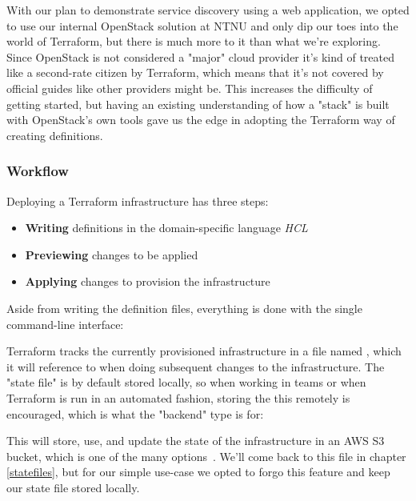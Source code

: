             With our plan to demonstrate service discovery using a web application, we opted to use our internal OpenStack solution at NTNU and only dip our toes into the world of Terraform, but there is much more to it than what we're exploring. Since OpenStack is not considered a "major" cloud provider it's kind of treated like a second-rate citizen by Terraform, which means that it's not covered by official guides like other providers might be. This increases the difficulty of getting started, but having an existing understanding of how a "stack" is built with OpenStack's own tools gave us the edge in adopting the Terraform way of creating definitions.
            
            \subsubsection{Workflow} \label{terraform_workflow}
                Deploying a Terraform infrastructure has three steps:
                \begin{itemize}
                    \item \textbf{Writing} definitions in the domain-specific language \textit{HCL}
                    \item \textbf{Previewing} changes to be applied
                    \item \textbf{Applying} changes to provision the infrastructure
                \end{itemize}
                
                Aside from writing the definition files, everything is done with the single  command-line interface:
                
                
                Terraform tracks the currently provisioned infrastructure in a file named , which it will reference to when doing subsequent changes to the infrastructure. The "state file" is by default stored locally, so when working in teams or when Terraform is run in an automated fashion, storing the this remotely is encouraged, which is what the "backend" type is for:
                
                
                This will store, use, and update the state of the infrastructure in an AWS S3 bucket, which is one of the many options~\cite{Terraform:Backends}. We'll come back to this file in chapter \ref{statefiles}, but for our simple use-case we opted to forgo this feature and keep our state file stored locally.
            
